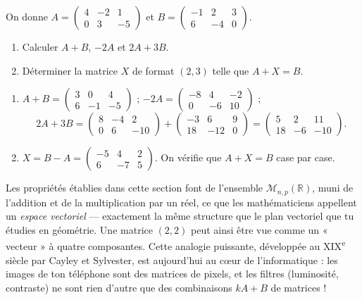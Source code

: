 \documentclass[11pt]{article}
\begin{document}
\begin{exercice}
On donne $A = \begin{pmatrix} 4 & -2 & 1 \\ 0 & 3 & -5 \end{pmatrix}$ et $B = \begin{pmatrix} -1 & 2 & 3 \\ 6 & -4 & 0 \end{pmatrix}$.
\begin{enumerate}
\item Calculer $A + B$, $-2A$ et $2A + 3B$.
\item Déterminer la matrice $X$ de format $(2,3)$ telle que $A + X = B$.
\end{enumerate}
\end{exercice}

\begin{corrige}
\begin{enumerate}
\item $A + B = \begin{pmatrix} 3 & 0 & 4 \\ 6 & -1 & -5 \end{pmatrix}$ ; \quad $-2A = \begin{pmatrix} -8 & 4 & -2 \\ 0 & -6 & 10 \end{pmatrix}$ ;
\[ 2A + 3B = \begin{pmatrix} 8 & -4 & 2 \\ 0 & 6 & -10 \end{pmatrix} + \begin{pmatrix} -3 & 6 & 9 \\ 18 & -12 & 0 \end{pmatrix} = \begin{pmatrix} 5 & 2 & 11 \\ 18 & -6 & -10 \end{pmatrix}. \]
\item $X = B - A = \begin{pmatrix} -5 & 4 & 2 \\ 6 & -7 & 5 \end{pmatrix}$. On vérifie que $A + X = B$ case par case.
\end{enumerate}
\end{corrige}

\begin{savaistu}
Les propriétés établies dans cette section font de l'ensemble $\mathcal{M}_{n,p}(\mathbb{R})$, muni de l'addition et de la multiplication par un réel, ce que les mathématiciens appellent un \emph{espace vectoriel} — exactement la même structure que le plan vectoriel que tu étudies en géométrie. Une matrice $(2,2)$ peut ainsi être vue comme un « vecteur » à quatre composantes. Cette analogie puissante, développée au XIX\textsuperscript{e} siècle par Cayley et Sylvester, est aujourd'hui au cœur de l'informatique : les images de ton téléphone sont des matrices de pixels, et les filtres (luminosité, contraste) ne sont rien d'autre que des combinaisons $kA + B$ de matrices !
\end{savaistu}
\end{document}
